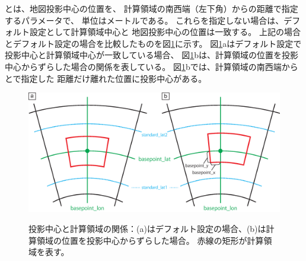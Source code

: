 \noindent 
{}とは、地図投影中心の位置を、
計算領域の南西端（左下角）からの距離で指定するパラメータで、
単位はメートルである。
これらを指定しない場合は、デフォルト設定として計算領域中心と
地図投影中心の位置は一致する。
上記の場合とデフォルト設定の場合を比較したものを図\ref{fig:map_lc}に示す。
図\ref{fig:map_lc}aはデフォルト設定で投影中心と計算領域中心が一致している場合、
図\ref{fig:map_lc}bは、計算領域の位置を投影中心からずらした場合の関係を表している。
図\ref{fig:map_lc}bでは、計算領域の南西端から
とで指定した
距離だけ離れた位置に投影中心がある。

\begin{figure}[t]
\begin{center}
  \includegraphics[width=0.8\hsize]{./figure/LC_latlon_xy.eps}\\
  \caption{投影中心と計算領域の関係：(a)はデフォルト設定の場合、(b)は計算領域の位置を投影中心からずらした場合。
  赤線の矩形が計算領域を表す。}
  \label{fig:map_lc}
\end{center}
\end{figure}

